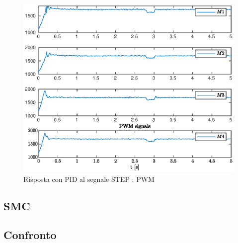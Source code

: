 \begin{figure}
	\centering
	\includegraphics[width=1\textwidth]{Simulazioni/Figure/STEPpwmPID}
	\caption{Risposta con PID al segnale STEP : PWM}
\end{figure}

\subsection{SMC}



\subsection{Confronto}